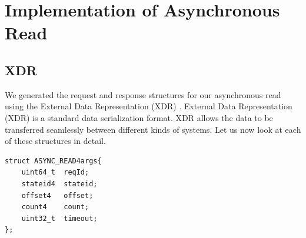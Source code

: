 \section{Implementation of Asynchronous Read}
\subsection{XDR}
We generated the request and response structures for our asynchronous read using the External Data Representation (XDR) \cite{XDR}. External Data Representation (XDR) is a standard data serialization format. XDR allows the data to be transferred seamlessly between different kinds of systems. Let us now look at each of these structures in detail.

\begin{lstlisting}
struct ASYNC_READ4args{
	uint64_t  reqId; 
	stateid4  stateid; 
	offset4	  offset; 
	count4	  count;
	uint32_t  timeout; 
};
\end{lstlisting}

